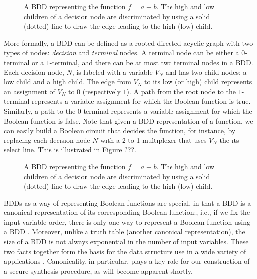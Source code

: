 \begin{figure}[ht]
  \caption{A BDD representing the function $f = a \equiv b$. The high and low children of a decision node are discriminated by using a solid (dotted) line to draw the edge leading to the high (low) child.}
  \label{fig:dummy2}
\end{figure}

More formally, a BDD can be defined as a rooted directed acyclic graph with two types of nodes: \emph{decision} and \emph{terminal} nodes. A terminal node can be either a $0$-terminal or a $1$-terminal, and there can be at most two terminal nodes in a BDD. Each decision node, $N$, is labeled with a variable $V_N$ and has two child nodes: a low child and a high child. The edge from $V_N$ to its low (or high) child represents an assignment of $V_N$ to $0$ (respectively $1$). A path from the root node to the $1$-terminal represents a variable assignment for which the Boolean function is true. Similarly, a path to the $0$-terminal represents a variable assignment for which the Boolean function is false. Note that given a BDD representation of a function, we can easily build a Boolean circuit that decides the function, for instance, by replacing each decision node $N$ with a 2-to-1 multiplexer that uses $V_N$ the its select line. This is illustrated in Figure ???.

\begin{figure}[ht]
  \caption{A BDD representing the function $f = a \equiv b$. The high and low children of a decision node are discriminated by using a solid (dotted) line to draw the edge leading to the high (low) child.}
  \label{fig:dummy3}
\end{figure}

BDDs as a way of representing Boolean functions are special, in that a BDD is a canonical representation of its corresponding Boolean function:, i.e., if we fix the input variable order, there is only one way to represent a Boolean function using a BDD \cite{}. Moreover, unlike a truth table (another canonical representation), the size of a BDD is not always exponential in the number of input variables. These two facts together form the basis for the data structure use in a wide variety of applications \cite{}. Canonicality, in particular, plays a key role for our construction of a secure synthesis procedure, as will become apparent shortly.

